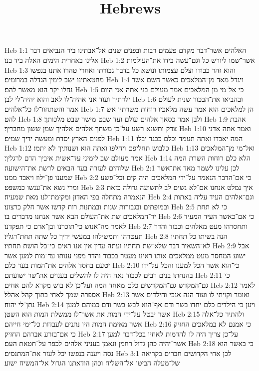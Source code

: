 

\title{Hebrews}

Heb 1:1  האלהים אשר־דבר מקדם פעמים רבות ובפנים שנים אל־אבתינו ביד הנביאים דבר אלינו באחרית הימים האלה ביד בנו׃
Heb 1:2  אשר־שמו ליורש כל וגם־עשה בידו את־העולמות׃
Heb 1:3  והוא זהר כבודו וצלם עצמותו ונושא כל בדבר גבורתו ואחרי טהרו אתנו בנפשו מחטאתינו ישב לימין הגדלה במרומים׃
Heb 1:4  ויגדל מאד מן־המלאכים כאשר השם אשר נחלו יקר הוא מאשר להם׃
Heb 1:5  כי אל־מי מן המלאכים אמר מעולם בני אתה אני היום ילדתיך ועוד אני אהיה־לו לאב והוא יהיה־לי לבן׃
Heb 1:6  ובהביאו את־הבכור שנית לעולם אמר והשתחוו־לו כל־אלהים׃
Heb 1:7  הן למלאכים הוא אמר עשה מלאכיו רוחות משרתיו אש להט׃
Heb 1:8  ולבן אמר כסאך אלהים עולם ועד שבט מישר שבט מלכותך׃
Heb 1:9  אהבת צדק ותשנא רשע על־כן משחך אלהים אלהיך שמן ששון מחבריך׃
Heb 1:10  ואמר אתה אדני לפנים הארץ יסדת ומעשה ידיך שמים׃
Heb 1:11  המה יאבדו ואתה תעמד וכלם כבגד יבלו׃
Heb 1:12  כלבוש תחליפם ויחלפו ואתה הוא ושנותיך לא יתמו׃
Heb 1:13  ואל־מי מן־המלאכים אמר מעולם שב לימיני עד־אשית איביך הדם לרגליך׃
Heb 1:14  הלא כלם רוחות השרת המה שלוחים לעזרה בעד הבאים לרשת את־הישועה׃
Heb 2:1  לכן עלינו לשמר מאד את־אשר שמענו פן־ילוז ויאבד ממנו׃
Heb 2:2  כי אם־הדבר הנאמר על־ידי המלאכים היה קים וכל־פשע ומרי נשא את־ענשו כמשפט׃
Heb 2:3  איך נמלט אנחנו אם־לא נשים לב לתשועה גדולה כזאת הנאמרה מתחלה בפי האדון ומקימת־לנו מאת שמעיה׃
Heb 2:4  וגם־אלהים העיד עליה באתות ובמופתים ובגבורות שנות ובמתנות רוח קדשו אשר חלק כרצונו׃
Heb 2:5  כי לא תחת יד־המלאכים שת את־העולם הבא אשר אנחנו מדברים בו׃
Heb 2:6  כי אם־כאשר העיד המעיד לאמר מה־אנוש כי־תזכרנו ובן־אדם כי תפקדנו׃
Heb 2:7  ותחסרהו מעט מאלהים וכבוד והדר תעטרהו ותמשילהו במעשי ידיך כל שתה תחת־רגליו׃
Heb 2:8  הנה בשיתו כל תחתיו לא־השאיר דבר שלא־שת תחתיו ועתה עדין אין אנו ראים כי־כל הושת תחתיו׃
Heb 2:9  אבל ישוע המחסר מעט ממלאכים אותו ראינו מעטר בכבוד והדר מפני ענותו עד־מות למען אשר יטעם בחסד אלהים את־המות בעד כלם׃
Heb 2:10  כי־הוא אשר הכל למענו והכל על־ידו בהנחתו בנים רבים לכבוד נאה היה לו להשלים בענוים את־שר ישועתם׃
Heb 2:11  כי גם־המקדש גם־המקדשים כלם מאחד המה ועל־כן לא בוש מקרא להם אחים׃
Heb 2:12  לאמר אספרה שמך לאחי בתוך קהל אהלל׃
Heb 2:13  ואומר וקויתי לו ועוד הנה אנכי והילדים אשר נתן־לי יהוה׃
Heb 2:14  ויען כי הילדים כלם יחדו בשר ודם אף־הוא לבש בשר ודם כמוהם למען אשר יבטל על־ידי המות את אשר־לו ממשלת המות הוא השטן׃
Heb 2:15  ולהתיר כל־אלה אשר מאימת המות היו נתנים לעבדות כל־ימי חייהם׃
Heb 2:16  כי אמנם לא במלאכים החזיק כי אם־בזרע אברהם החזיק׃
Heb 2:17  על־כן צריך היה לו להדמות לאחיו בכל־דבר למען אשר־יהיה כהן גדול רחמן ונאמן בעניני אלהים לכפר על־חטאת העם׃
Heb 2:18  כי באשר הוא נסה ויענה בנפשו יכל לעזר את־המתנסים׃
Heb 3:1  לכן אחי הקדושים חברים בקריאה של־מעלה הביטו אל־השליח וכהן הודאתנו הגדול אל־המשיח ישוע׃
